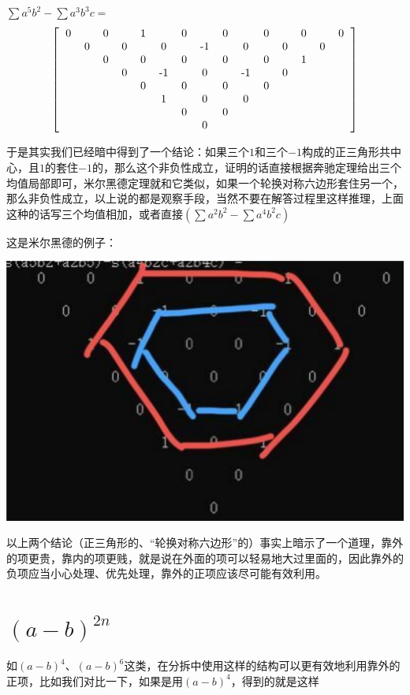 \documentclass[UTF8]{ctexart}
\begin{document}
$ \displaystyle  \sum a^{5}b^{2}-\displaystyle  \sum a^{3}b^{3}c= $
\renewcommand*{\arraystretch}{1.732}\[\left[\begin{matrix}
	\begin{tabular}{ccccccccccccccc}
		0& &0& &1& &0& &0& &0& &0& &0\\
		&0& &0& &0& &-1& &0& &0& &0&\\
		& &0& &0& &0& &0& &0& &1& &\\
		& & &0& &-1& &0& &-1& &0& & &\\
		& & & &0& &0& &0& &0& & & &\\
		& & & & &1& &0& &0& & & & &\\
		& & & & & &0& &0& & & & & &\\
		& & & & & & &0& & & & & & &\\
	\end{tabular}
\end{matrix}\right]\]


于是其实我们已经暗中得到了一个结论：如果三个$ 1 $和三个$ -1 $构成的正三角形共中心，且$ 1 $的套住$ -1 $的，那么这个非负性成立，证明的话直接根据奔驰定理给出三个均值局部即可，米尔黑德定理就和它类似，如果一个轮换对称六边形套住另一个，那么非负性成立，以上说的都是观察手段，当然不要在解答过程里这样推理，上面这种的话写三个均值相加，或者直接$ (\displaystyle \sum a^{2}b^{2}-\displaystyle \sum a^{4}b^{2}c) $

这是米尔黑德的例子：
\begin{center}
	\includegraphics[width=0.45\linewidth]{160}
\end{center}
以上两个结论（正三角形的、“轮换对称六边形”的）事实上暗示了一个道理，靠外的项更贵，靠内的项更贱，就是说在外面的项可以轻易地大过里面的，因此靠外的负项应当小心处理、优先处理，靠外的正项应该尽可能有效利用。\\

\section{$ (a-b)^{2n} $}

如$ (a-b)^{4} $、$ (a-b)^{6} $这类，在分拆中使用这样的结构可以更有效地利用靠外的正项，比如我们对比一下，如果是用$ (a-b)^{4} $，得到的就是这样
\end{document}
